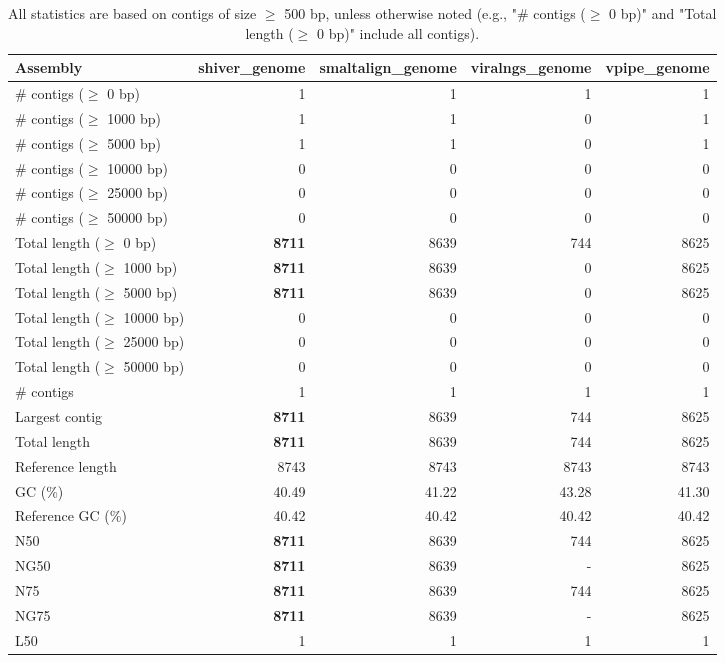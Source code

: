 \documentclass[12pt,a4paper]{article}
\begin{document}
\begin{table}[ht]
\begin{center}
\caption{All statistics are based on contigs of size $\geq$ 500 bp, unless otherwise noted (e.g., "\# contigs ($\geq$ 0 bp)" and "Total length ($\geq$ 0 bp)" include all contigs).}
\begin{tabular}{|l*{4}{|r}|}
\hline
Assembly & shiver\_genome & smaltalign\_genome & viralngs\_genome & vpipe\_genome \\ \hline
\# contigs ($\geq$ 0 bp) & 1 & 1 & 1 & 1 \\ \hline
\# contigs ($\geq$ 1000 bp) & 1 & 1 & 0 & 1 \\ \hline
\# contigs ($\geq$ 5000 bp) & 1 & 1 & 0 & 1 \\ \hline
\# contigs ($\geq$ 10000 bp) & 0 & 0 & 0 & 0 \\ \hline
\# contigs ($\geq$ 25000 bp) & 0 & 0 & 0 & 0 \\ \hline
\# contigs ($\geq$ 50000 bp) & 0 & 0 & 0 & 0 \\ \hline
Total length ($\geq$ 0 bp) & {\bf 8711} & 8639 & 744 & 8625 \\ \hline
Total length ($\geq$ 1000 bp) & {\bf 8711} & 8639 & 0 & 8625 \\ \hline
Total length ($\geq$ 5000 bp) & {\bf 8711} & 8639 & 0 & 8625 \\ \hline
Total length ($\geq$ 10000 bp) & 0 & 0 & 0 & 0 \\ \hline
Total length ($\geq$ 25000 bp) & 0 & 0 & 0 & 0 \\ \hline
Total length ($\geq$ 50000 bp) & 0 & 0 & 0 & 0 \\ \hline
\# contigs & 1 & 1 & 1 & 1 \\ \hline
Largest contig & {\bf 8711} & 8639 & 744 & 8625 \\ \hline
Total length & {\bf 8711} & 8639 & 744 & 8625 \\ \hline
Reference length & 8743 & 8743 & 8743 & 8743 \\ \hline
GC (\%) & 40.49 & 41.22 & 43.28 & 41.30 \\ \hline
Reference GC (\%) & 40.42 & 40.42 & 40.42 & 40.42 \\ \hline
N50 & {\bf 8711} & 8639 & 744 & 8625 \\ \hline
NG50 & {\bf 8711} & 8639 & - & 8625 \\ \hline
N75 & {\bf 8711} & 8639 & 744 & 8625 \\ \hline
NG75 & {\bf 8711} & 8639 & - & 8625 \\ \hline
L50 & 1 & 1 & 1 & 1 \\ \hline

\end{tabular}
\end{center}
\end{table}
\end{document}

